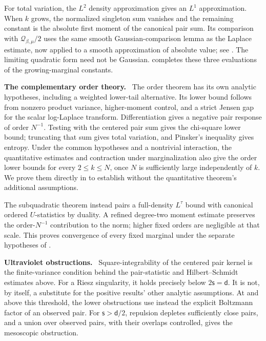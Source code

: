 \documentclass[11pt,reqno]{amsart}
\numberwithin{equation}{section}
\theoremstyle{plain}
\theoremstyle{remark}
\renewcommand{\d}{\mathsf{d}}
\newcommand{\be}{\beta}
\newcommand{\s}{\mathsf{s}}
\newcommand{\parheading}[1]{\par\medskip\noindent\textbf{#1}\ }
\begin{document}
For total variation, the $L^2$ density approximation gives an $L^1$ approximation.  When $k$ grows, the normalized singleton sum vanishes and the remaining constant is the absolute first moment of the canonical pair sum.  Its comparison with $\mathcal Q_{\be,\mu}/2$ uses the same smooth Gaussian-comparison lemma as the Laplace estimate, now applied to a smooth approximation of absolute value; see .  The limiting quadratic form need not be Gaussian.   completes these three evaluations of the growing-marginal constants.

\parheading{The complementary order theory.}
The order theorem has its own analytic hypotheses, including a weighted lower-tail alternative.  Its lower bound follows from nonzero product variance, higher-moment control, and a strict Jensen gap for the scalar log-Laplace transform.  Differentiation gives a negative pair response of order $N^{-1}$.  Testing with the centered pair sum gives the chi-square lower bound; truncating that sum gives total variation, and Pinsker's inequality gives entropy.  Under the common hypotheses and a nontrivial interaction, the quantitative estimates and contraction under marginalization also give the order lower bounds for every $2\leq k\leq N$, once $N$ is sufficiently large independently of $k$.  We prove them directly in  to establish  without the quantitative theorem's additional assumptions.

The subquadratic theorem instead pairs a full-density $L^\tau$ bound with canonical ordered $U$-statistics by duality.  A refined degree-two moment estimate preserves the order-$N^{-1}$ contribution to the norm; higher fixed orders are negligible at that scale.  This proves convergence of every fixed marginal under the separate hypotheses of .

\parheading{Ultraviolet obstructions.}
Square-integrability of the centered pair kernel is the finite-variance condition behind the pair-statistic and Hilbert--Schmidt estimates above.  For a Riesz singularity, it holds precisely below $2\s=\d$.  It is not, by itself, a substitute for the positive results' other analytic assumptions.  At and above this threshold, the lower obstructions use instead the explicit Boltzmann factor of an observed pair.  For $\s>\d/2$, repulsion depletes sufficiently close pairs, and a union over observed pairs, with their overlaps controlled, gives the mesoscopic obstruction.
\end{document}
